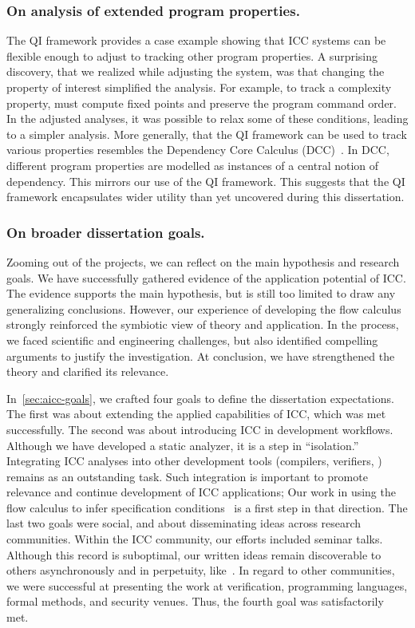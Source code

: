\subsubsection*{On analysis of extended program properties.}
The QI framework provides a case example showing that ICC systems can be flexible enough to adjust to tracking other program properties.
A surprising discovery, that we realized while adjusting the system, was that changing the property of interest simplified the analysis.
For example, to track a complexity property, must compute fixed points and preserve the program command order.
In the adjusted analyses, it was possible to relax some of these conditions, leading to a simpler analysis.
More generally, that the QI framework can be used to track various properties resembles the Dependency Core Calculus (DCC)~\cite{abadi1999b}.
In DCC, different program properties are modelled as instances of a central notion of dependency.
This mirrors our use of the QI framework.
This suggests that the QI framework encapsulates wider utility than yet uncovered during this dissertation.

\subsubsection*{On broader dissertation goals.}
Zooming out of the projects, we can reflect on the main hypothesis and research goals.
We have successfully gathered evidence of the application potential of ICC.
The evidence supports the main hypothesis, but is still too limited to draw any generalizing conclusions.
However, our experience of developing the flow calculus strongly reinforced the symbiotic view of theory and application.
In the process, we faced scientific and engineering challenges, but also identified compelling arguments to justify the investigation.
At conclusion, we have strengthened the theory and clarified its relevance.

In~\autoref{sec:aicc-goals}, we crafted four goals to define the dissertation expectations.
The first was about extending the applied capabilities of ICC, which was met successfully.
The second was about introducing ICC in development workflows.
Although we have developed a static analyzer, it is a step in \enquote{isolation.}
Integrating ICC analyses into other development tools (compilers, verifiers, \etc) remains as an outstanding task.
Such integration is important to promote relevance and continue development of ICC {applications};
Our work in using the flow calculus to infer specification conditions~\cite{rusch2025} is a first step in that direction.
The last two goals were social, and about disseminating ideas across research communities.
Within the ICC community, our efforts included seminar talks.
Although this record is suboptimal, our written ideas remain discoverable to others asynchronously and in perpetuity, like~\cite{moyen2017}.
In regard to other communities, we were successful at presenting the work at verification, programming languages, formal methods, and security venues.
Thus, the fourth goal was satisfactorily met.

